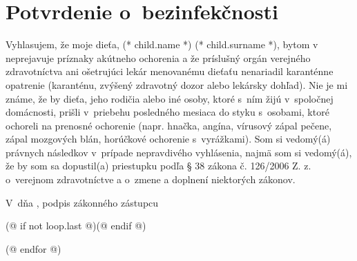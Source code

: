 \documentclass[12pt, twoside]{article}
\begin{document}
    \section{Potvrdenie o~bezinfekčnosti}
        Vyhlasujem, že moje dieťa, (* child.name *) (* child.surname *), bytom v~\makebox[30mm]{\dotfill} neprejavuje príznaky akútneho ochorenia a že
        príslušný orgán verejného zdravotníctva ani ošetrujúci lekár menovanému dieťaťu nenariadil
        karanténne opatrenie (karanténu, zvýšený zdravotný dozor alebo lekársky dohľad). Nie je mi známe, že
        by dieťa, jeho rodičia alebo iné osoby, ktoré s~ním žijú v~spoločnej domácnosti, prišli v~priebehu
        posledného mesiaca do styku s~osobami, ktoré ochoreli na prenosné ochorenie (napr. hnačka, angína,
        vírusový zápal pečene, zápal mozgových blán, horúčkové ochorenie s~vyrážkami). Som si
        vedomý(á) právnych následkov v~prípade nepravdivého vyhlásenia, najmä som si vedomý(á), že by som sa
        dopustil(a) priestupku podľa § 38 zákona č. 126/2006 Z. z. o~verejnom zdravotníctve a o~zmene a
        doplnení niektorých zákonov.
        \vspace{5mm}

        V~\dotfill dňa \dotfill, \hfill podpis zákonného zástupcu \dotfill
        \vspace*{5mm}

    \cutHere
    (@ if not loop.last @)\newpage(@ endif @)

    (@ endfor @)
\end{document}
